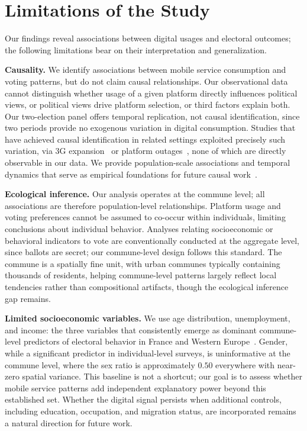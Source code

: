 \documentclass[9pt,sigconf,letterpaper]{acmart}
\begin{document}
\section{Limitations of the Study}
\label{sec:limitations}

Our findings reveal associations between digital usages and electoral outcomes; the following limitations bear on their interpretation and generalization.

\noindent\textbf{Causality.}
We identify associations between mobile service consumption and voting patterns, but do not claim causal relationships. Our observational data cannot distinguish whether usage of a given platform directly influences political views, or political views drive platform selection, or third factors explain both.
Our two-election panel offers temporal replication, not causal identification, since two periods provide no exogenous variation in digital consumption. 
Studies that have achieved causal identification in related settings exploited precisely such variation, via 3G expansion~\cite{melnikov2021mobile} or platform outages~\cite{muller2021fanning}, none of which are directly observable in our data.
We provide population-scale associations and temporal dynamics that serve as empirical foundations for future causal work~\cite{lorenz2023systematic}.

\noindent\textbf{Ecological inference.}
Our analysis operates at the commune level; all associations are therefore population-level relationships. Platform usage and voting preferences cannot be assumed to co-occur within individuals, limiting conclusions about individual behavior. Analyses relating socioeconomic or behavioral indicators to vote are conventionally conducted at the aggregate level, since ballots are secret; our commune-level design follows this standard. The commune is a spatially fine unit, with urban communes typically containing thousands of residents, helping commune-level patterns largely reflect local tendencies rather than compositional artifacts, though the ecological inference gap remains.

\noindent\textbf{Limited socioeconomic variables.}
We use age distribution, unemployment, and income: the three variables that consistently emerge as dominant commune-level predictors of electoral behavior in France and Western Europe~\cite{bolet2020local,vasilopoulos2021residential,gethin2022brahmin,sipma2020contextual,sanchez2025has}. Gender, while a significant predictor in individual-level surveys, is uninformative at the commune level, where the sex ratio is approximately $0.50$ everywhere with near-zero spatial variance. This baseline is not a shortcut; our goal is to assess whether mobile service patterns add independent explanatory power beyond this established set. Whether the digital signal persists when additional controls, including education, occupation, and migration status, are incorporated remains a natural direction for future work.
\end{document}
